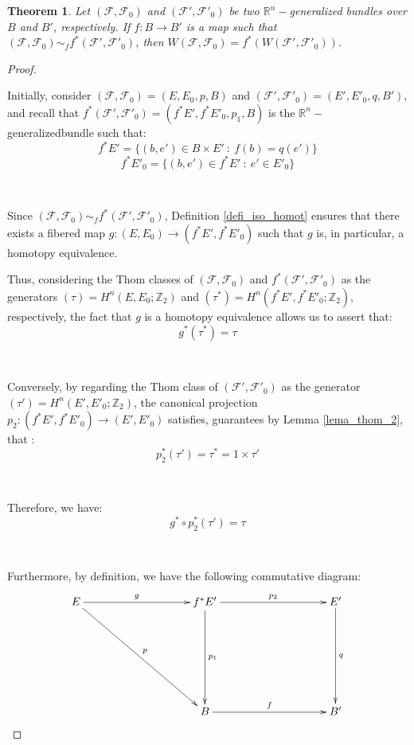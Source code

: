 \documentclass[12pt,oneside]{book}
\newtheorem{teo}    {Theorem}[chapter]
\newcommand{\R}{\mathbb{R}}
\newcommand{\Z}{\mathbb{Z}}
\begin{document}
    \begin{teo}\label{res_SW_fht_2}
    	Let $(\mathcal{F},\mathcal{F}_{0})$ and $(\mathcal{F'},\mathcal{F'}_{0})$ be two $\R^{n}-$generalized bundles over $B$ and $B'$, 
        respectively. If $f:B\to B'$ is a map such that $(\mathcal{F},\mathcal{F}_{0})\sim_{f} f^{*}(\mathcal{F'},\mathcal{F'}_{0})$, then 
        $W(\mathcal{F},\mathcal{F}_{0})=f^{*}(W(\mathcal{F'},\mathcal{F'}_{0}))$.
    \end{teo}
    \begin{proof}

        \

        Initially, consider $(\mathcal{F},\mathcal{F}_{0})=(E,E_{0},p,B)$ and $(\mathcal{F'},\mathcal{F'}_{0})=(E',E'_{0},q,B')$, and recall 
        that $f^{*}(\mathcal{F'},\mathcal{F'}_{0})=(f^{*}E',f^{*}E'_{0},p_{1},B)$ is the $\R^{n}-$ generalizedbundle such that:
        $$f^{*}E'=\{ (b,e')\in B\times E' \ : \ f(b)=q(e') \}$$
        $$f^{*}E'_{0}=\{ (b,e')\in f^{*}E' \ : \ e'\in E'_{0} \}$$

        \

        Since $(\mathcal{F},\mathcal{F}_{0})\sim_{f} f^{*}(\mathcal{F'},\mathcal{F'}_{0})$, Definition \ref{defi_iso_homot} ensures that 
        there exists a fibered map $g:(E,E_{0})\to (f^{*}E',f^{*}E'_{0})$ such that $g$ is, in particular, a homotopy 
        equivalence.

        Thus, considering the Thom classes of $(\mathcal{F},\mathcal{F}_{0})$ and $f^{*}(\mathcal{F'},\mathcal{F'}_{0})$ as 
        the generators $(\tau)=H^{n}(E,E_{0};\Z_{2})$ and $(\tau^{*})=H^{n}(f^{*}E',f^{*}E'_{0};\Z_{2})$, respectively, the fact that $g$ is 
        a homotopy equivalence allows us to assert that:
        $$ g^{*}(\tau^{*})=\tau $$

        \

        Conversely, by regarding the Thom class of $(\mathcal{F'},\mathcal{F'}_{0})$ as the generator $(\tau')=H^{n}(E',E'_{0};\Z_{2})$, 
        the canonical projection $p_{2}:(f^{*}E',f^{*}E'_{0})\to (E',E'_{0})$ satisfies, guarantees by Lemma \ref{lema_thom_2}, that :
        $$ p_{2}^{*}(\tau')=\tau^{*}=1\times \tau' $$

        \

        Therefore, we have:
        $$ g^{*}\circ p_{2}^{*}(\tau')=\tau $$

        \

        Furthermore, by definition, we have the following commutative diagram:
        $$ \xymatrix @C=0.5cm {
        	E \ar[rrrrr]^-{g} \ar[rrrrrddd]^-{p} &&&&& f^{*}E' \ar[rrrrr]^-{p_{2}} \ar[ddd]^-{p_{1}} &&&&& E' \ar[ddd]^-{q} \\
        	&&&&& &&&&& \\
        	&&&&& &&&&& \\
        	&&&&& B \ar[rrrrr]^-{f} &&&&& B'
        } $$


\end{proof}
\end{document}

